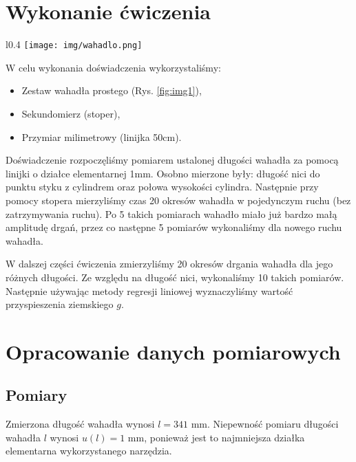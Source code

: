 \documentclass[12pt,a4paper]{article}
\numberwithin{equation}{section}
\newcommand*{\captionsource}[2]{%
	\caption[{#1}]{%
		#1%
		\\\hspace{\linewidth}%
		\textbf{Żródło:} #2%
	}%
}
\begin{document}
\pagebreak
\section{Wykonanie ćwiczenia}
\begin{wrapfigure}{l}{0.4\textwidth}
	\texttt{[image: img/wahadlo.png]} 
	\captionsource{Schemat wahadła}{instrukcja do ćw.}
	\label{fig:img1}
\end{wrapfigure}

W celu wykonania doświadczenia wykorzystaliśmy:
\begin{itemize}
	\item Zestaw wahadła prostego (Rys. \ref{fig:img1}),
	\item Sekundomierz (stoper),
	\item Przymiar milimetrowy (linijka 50cm).
\end{itemize}

Doświadczenie rozpoczęliśmy pomiarem ustalonej długości wahadła za pomocą linijki o działce elementarnej 1mm. Osobno mierzone były: długość nici do punktu styku z cylindrem oraz połowa wysokości cylindra. Następnie przy pomocy stopera mierzyliśmy czas 20 okresów wahadła w pojedynczym ruchu (bez zatrzymywania ruchu). Po 5 takich pomiarach wahadło miało już bardzo małą amplitudę drgań, przez co następne 5 pomiarów wykonaliśmy dla nowego ruchu wahadła.

W dalszej części ćwiczenia zmierzyliśmy 20 okresów drgania wahadła dla jego różnych długości. Ze względu na długość nici, wykonaliśmy 10 takich pomiarów. Następnie używając metody regresji liniowej wyznaczyliśmy wartość przyspieszenia ziemskiego $g$.
\pagebreak
\section{Opracowanie danych pomiarowych}
\subsection{Pomiary}
Zmierzona długość wahadła wynosi $l = 341$ mm. Niepewność pomiaru długości wahadła $l$ wynosi $u(l) = 1$ mm, ponieważ jest to najmniejsza działka elementarna wykorzystanego narzędzia.
\end{document}

